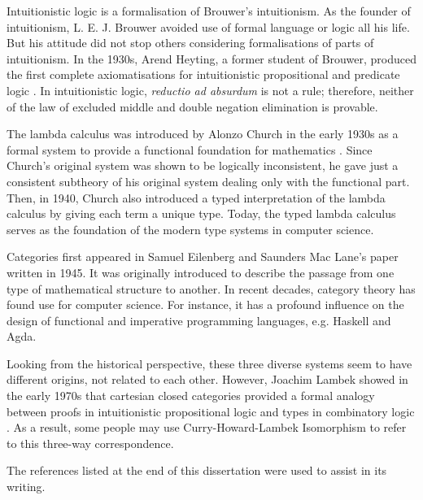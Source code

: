 Intuitionistic logic is a formalisation of Brouwer’s intuitionism. As the founder of intuitionism, L. E. J. Brouwer avoided use of formal language or logic all his life. But his attitude did not stop others considering formalisations of parts of intuitionism. In the 1930s, Arend Heyting, a former student of Brouwer, produced the first complete axiomatisations for intuitionistic propositional and predicate logic \cite{Rui91}. In intuitionistic logic, \emph{reductio ad absurdum} is not a rule; therefore, neither of the law of excluded middle and double negation elimination is provable.

The lambda calculus was introduced by Alonzo Church in the early 1930s as a formal system to provide a functional foundation for mathematics \cite{Bar85,Hin97}. Since Church's original system was shown to be logically inconsistent, he gave just a consistent subtheory of his original system dealing only with the functional part. Then, in 1940, Church also introduced a typed interpretation of the lambda calculus by giving each term a unique type. Today, the typed lambda calculus serves as the foundation of the modern type systems in computer science.

Categories first appeared in Samuel Eilenberg and Saunders Mac Lane's paper \cite{SS45} written in 1945. It was originally introduced to describe the passage from one type of mathematical structure to another. In recent decades, category theory has found use for computer science. For instance, it has a profound influence on the design of functional and imperative programming languages, e.g. Haskell and Agda.

Looking from the historical perspective, these three diverse systems seem to have different origins, not related to each other. However, Joachim Lambek showed in the early 1970s that cartesian closed categories provided a formal analogy between proofs in intuitionistic propositional logic and types in combinatory logic \cite{Lam72}. As a result, some people may use Curry-Howard-Lambek Isomorphism to refer to this three-way correspondence.

The references listed at the end of this dissertation were used to assist in its writing.